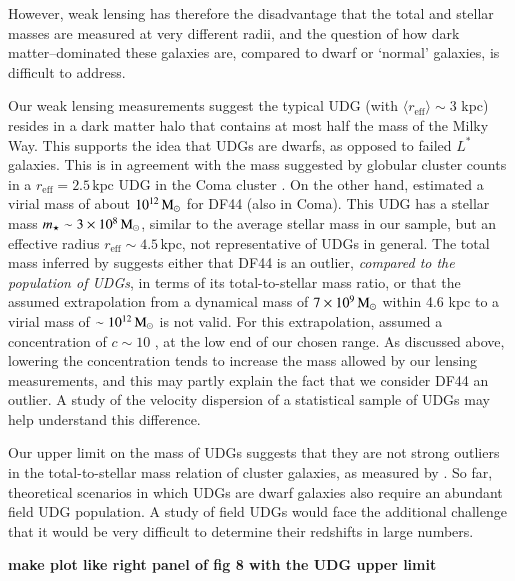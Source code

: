 \documentclass[usenatbib,fleqn]{mnras}
\def\reff{r_\mathrm{eff}}
\begin{document}
However, weak lensing has therefore the disadvantage that the total and stellar masses are measured at very different radii, and the question of how dark matter--dominated these galaxies are, compared to dwarf or `normal' galaxies, is difficult to address.

Our weak lensing measurements suggest the typical UDG (with $\langle\reff\rangle\sim3$ kpc) resides in a dark matter halo that contains at most half the mass of the Milky Way. This supports the idea that UDGs are dwarfs, as opposed to failed $L^*$ galaxies. This is in agreement with the mass suggested by globular cluster counts in a $\reff=2.5\,\mathrm{kpc}$ UDG in the Coma cluster \citep{beasley16_acs,peng16}. On the other hand, \cite{vandokkum16} estimated a virial mass of about $10^{12}\,\mathrm{M}_\odot$ for DF44 (also in Coma). This UDG has a stellar mass $m_\star\sim3\times10^8\,\mathrm{M}_\odot$, similar to the average stellar mass in our sample, but an effective radius $\reff\sim4.5\,\mathrm{kpc}$, not representative of UDGs in general. The total mass inferred by \cite{vandokkum16} suggests either that DF44 is an outlier, \emph{compared to the population of UDGs}, in terms of its total-to-stellar mass ratio, or that the assumed extrapolation from a dynamical mass of $7\times10^9\,\mathrm{M}_\odot$ within 4.6 kpc to a virial mass of $\sim10^{12}\,\mathrm{M}_\odot$ is not valid. For this extrapolation, \cite{vandokkum16} assumed a concentration of $c\sim10$ \citep{maccio08}, at the low end of our chosen range. As discussed above, lowering the concentration tends to increase the mass allowed by our lensing measurements, and this may partly explain the fact that we consider DF44 an outlier. A study of the velocity dispersion of a statistical sample of UDGs may help understand this difference.

Our upper limit on the mass of UDGs suggests that they are not strong outliers in the total-to-stellar mass relation of cluster galaxies, as measured by \cite{sifon17}. So far, theoretical scenarios in which UDGs are dwarf galaxies also require an abundant field UDG population. A study of field UDGs would face the additional challenge that it would be very difficult to determine their redshifts in large numbers.

\textbf{make plot like right panel of fig 8 with the UDG upper limit}





\end{document}
